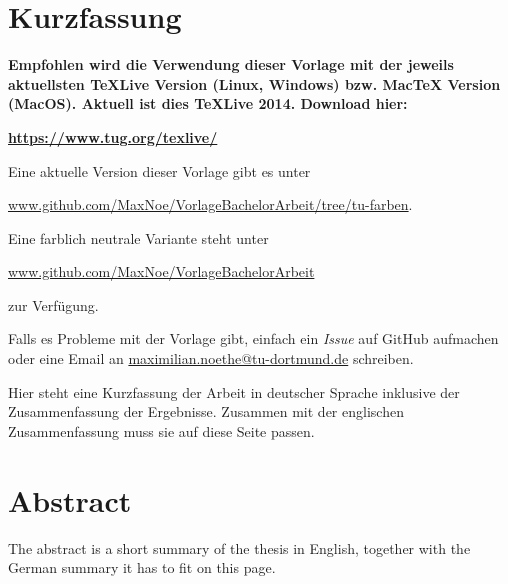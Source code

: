 \thispagestyle{plain}
\section*{Kurzfassung}

\textbf{\large Empfohlen wird die Verwendung dieser Vorlage mit der jeweils aktuellsten TeXLive Version (Linux, Windows) bzw. MacTeX Version (MacOS).
Aktuell ist dies TeXLive 2014. Download hier: }

\href{https://www.tug.org/texlive/}{\textbf{\large https://www.tug.org/texlive/}}

Eine aktuelle Version dieser Vorlage gibt es unter 

\href{https://github.com/MaxNoe/VorlageBachelorArbeit/tree/tu-farben}{www.github.com/MaxNoe/VorlageBachelorArbeit/tree/tu-farben}.

Eine farblich neutrale Variante steht unter  

\href{https://github.com/MaxNoe/VorlageBachelorArbeit}{www.github.com/MaxNoe/VorlageBachelorArbeit}

zur Verfügung.

Falls es Probleme mit der Vorlage gibt, einfach ein \emph{Issue} auf GitHub aufmachen oder eine Email an
\href{mailto:maximilian.noethe@tu-dortmund.de}{maximilian.noethe@tu-dortmund.de} schreiben.


Hier steht eine Kurzfassung der Arbeit in deutscher Sprache inklusive der Zusammenfassung der
Ergebnisse.
Zusammen mit der englischen Zusammenfassung muss sie auf diese Seite passen.

\section*{Abstract}

The abstract is a short summary of the thesis in English, together with the German summary it has to fit on this page.
